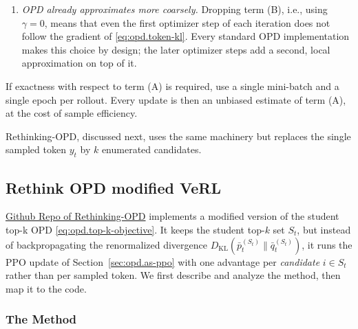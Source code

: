 \begin{remark}
\begin{enumerate}
\begin{align*}
            D_{\mathrm{KL}}(\mu_{\theta_{\mathrm{old}}}\|\mu_\theta)
            =
            \E_{\mu_{\theta_{\mathrm{old}}}}
            \left[
                \sum_{t=1}^{T(y)}D_{\mathrm{KL}}(p_t^{\mathrm{old}}\|p_t)
            \right].
        \end{align*}
        The gap is therefore controlled by how far the policy has moved since the rollout,
        which is what a trust region (PPO's clip, or TRPO's KL constraint) is designed to keep
        small. The prefix mismatch is thus not a separate flaw next to the trust region; it is
        the reason a trust region is needed.
        \item \emph{OPD already approximates more coarsely.} Dropping term (B), i.e., using
        $\gamma=0$, means that even the first optimizer step of each iteration does not follow
        the gradient of \eqref{eq:opd.token-kl}. Every standard OPD implementation makes this
        choice by design; the later optimizer steps add a second, local approximation on top
        of it.
    \end{enumerate}
    If exactness with respect to term (A) is required, use a single mini-batch and a single
    epoch per rollout. Every update is then an unbiased estimate of term (A), at the cost of
    sample efficiency.
\end{remark}

Rethinking-OPD, discussed next, uses the same machinery but replaces the single sampled
token $y_t$ by $k$ enumerated candidates.

\subsection{Rethink OPD modified VeRL}

\href{https://github.com/Thinking-Space/Rethinking-OPD/tree/ac26e38d6f1572eb027597b48a9f4e01f6915ef8}{Github Repo of Rethinking-OPD} implements a modified version of the student top-k OPD \eqref{eq:opd.top-k-objective}. It keeps the student
top-$k$ set $S_t$, but instead of backpropagating the renormalized divergence
$D_{\mathrm{KL}}(\bar p_t^{(S_t)}\|\bar q_t^{(S_t)})$, it runs the PPO update of
Section~\ref{sec:opd.as-ppo} with one advantage per \emph{candidate} $i\in S_t$ rather than
per sampled token. We first describe and analyze the method, then map it to the code.

\subsubsection{The Method}
\label{sec:opd.rethinking-method}

